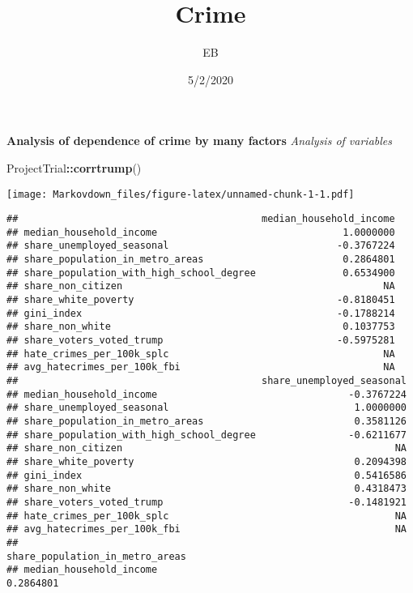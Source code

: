 \documentclass[
]{article}
\title{Crime}
\author{EB}
\date{5/2/2020}
\newenvironment{Shaded}{\begin{snugshade}}{\end{snugshade}}
\newcommand{\KeywordTok}[1]{\textcolor[rgb]{0.13,0.29,0.53}{\textbf{#1}}}
\newcommand{\NormalTok}[1]{#1}
\newcommand{\OperatorTok}[1]{\textcolor[rgb]{0.81,0.36,0.00}{\textbf{#1}}}
\begin{document}
\maketitle

\textbf{Analysis of dependence of crime by many factors} \emph{Analysis
of variables}

\begin{Shaded}
\begin{Highlighting}[]
\NormalTok{ProjectTrial}\OperatorTok{::}\KeywordTok{corrtrump}\NormalTok{()}
\end{Highlighting}
\end{Shaded}

\texttt{[image: Markovdown\_files/figure-latex/unnamed-chunk-1-1.pdf]}

\begin{verbatim}
##                                          median_household_income
## median_household_income                                1.0000000
## share_unemployed_seasonal                             -0.3767224
## share_population_in_metro_areas                        0.2864801
## share_population_with_high_school_degree               0.6534900
## share_non_citizen                                             NA
## share_white_poverty                                   -0.8180451
## gini_index                                            -0.1788214
## share_non_white                                        0.1037753
## share_voters_voted_trump                              -0.5975281
## hate_crimes_per_100k_splc                                     NA
## avg_hatecrimes_per_100k_fbi                                   NA
##                                          share_unemployed_seasonal
## median_household_income                                 -0.3767224
## share_unemployed_seasonal                                1.0000000
## share_population_in_metro_areas                          0.3581126
## share_population_with_high_school_degree                -0.6211677
## share_non_citizen                                               NA
## share_white_poverty                                      0.2094398
## gini_index                                               0.5416586
## share_non_white                                          0.4318473
## share_voters_voted_trump                                -0.1481921
## hate_crimes_per_100k_splc                                       NA
## avg_hatecrimes_per_100k_fbi                                     NA
##                                          share_population_in_metro_areas
## median_household_income                                        0.2864801

\end{verbatim}
\end{document}
